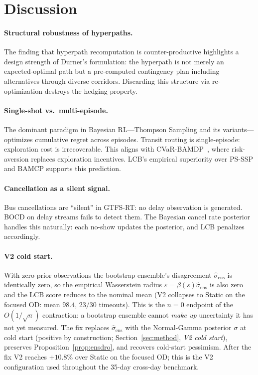 \documentclass[11pt]{article}
\theoremstyle{definition}
\theoremstyle{remark}
\begin{document}
\section{Discussion}
\label{sec:discussion}

\paragraph{Structural robustness of hyperpaths.}
The finding that hyperpath recomputation is counter-productive highlights a design strength of Durner's formulation: the hyperpath is not merely an expected-optimal path but a pre-computed contingency plan including alternatives through diverse corridors. Discarding this structure via re-optimization destroys the hedging property.

\paragraph{Single-shot vs.\ multi-episode.}
The dominant paradigm in Bayesian RL---Thompson Sampling and its variants---optimizes cumulative regret across episodes. Transit routing is single-episode: exploration cost is irrecoverable. This aligns with CVaR-BAMDP~\cite{rigter2021}, where risk-aversion replaces exploration incentives. LCB's empirical superiority over PS-SSP and BAMCP supports this prediction.

\paragraph{Cancellation as a silent signal.}
Bus cancellations are ``silent'' in GTFS-RT: no delay observation is generated. BOCD on delay streams fails to detect them. The Bayesian cancel rate posterior handles this naturally: each no-show updates the posterior, and LCB penalizes accordingly.

\paragraph{V2 cold start.}
With zero prior observations the bootstrap ensemble's
disagreement $\hat\sigma_{\mathrm{ens}}$ is identically zero, so
the empirical Wasserstein radius
$\varepsilon = \beta(s)\hat\sigma_{\mathrm{ens}}$ is also zero
and the LCB score reduces to the nominal mean (V2 collapses to
Static on the focused OD: mean $98.4$, $23/30$ timeouts). This is
the $n{=}0$ endpoint of the $O(1/\sqrt n)$ contraction: a
bootstrap ensemble cannot \emph{make up} uncertainty it has not
yet measured. The fix replaces
$\hat\sigma_{\mathrm{ens}}$ with the Normal-Gamma posterior
$\sigma$ at cold start (positive by construction;
Section~\ref{sec:method}, \emph{V2 cold start}), preserves
Proposition~\ref{prop:ensdro}, and recovers cold-start
pessimism. After the fix V2 reaches $+10.8\%$ over Static on the
focused OD; this is the V2 configuration used throughout the
35-day cross-day benchmark.
\end{document}
